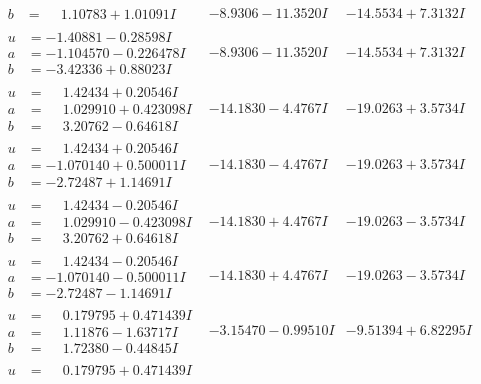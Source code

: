 \documentclass[1p]{elsarticle_modified}
\theoremstyle{definition}
\begin{document}
$$\begin{array}{c|c|c}
\begin{aligned}
b &= \phantom{-}1.10783 + 1.01091 I\end{aligned}
 & -8.9306 - 11.3520 I & -14.5534 + 7.3132 I \\ \hline\begin{aligned}
u &= -1.40881 - 0.28598 I \\
a &= -1.104570 - 0.226478 I \\
b &= -3.42336 + 0.88023 I\end{aligned}
 & -8.9306 - 11.3520 I & -14.5534 + 7.3132 I \\ \hline\begin{aligned}
u &= \phantom{-}1.42434 + 0.20546 I \\
a &= \phantom{-}1.029910 + 0.423098 I \\
b &= \phantom{-}3.20762 - 0.64618 I\end{aligned}
 & -14.1830 - 4.4767 I & -19.0263 + 3.5734 I \\ \hline\begin{aligned}
u &= \phantom{-}1.42434 + 0.20546 I \\
a &= -1.070140 + 0.500011 I \\
b &= -2.72487 + 1.14691 I\end{aligned}
 & -14.1830 - 4.4767 I & -19.0263 + 3.5734 I \\ \hline\begin{aligned}
u &= \phantom{-}1.42434 - 0.20546 I \\
a &= \phantom{-}1.029910 - 0.423098 I \\
b &= \phantom{-}3.20762 + 0.64618 I\end{aligned}
 & -14.1830 + 4.4767 I & -19.0263 - 3.5734 I \\ \hline\begin{aligned}
u &= \phantom{-}1.42434 - 0.20546 I \\
a &= -1.070140 - 0.500011 I \\
b &= -2.72487 - 1.14691 I\end{aligned}
 & -14.1830 + 4.4767 I & -19.0263 - 3.5734 I \\ \hline\begin{aligned}
u &= \phantom{-}0.179795 + 0.471439 I \\
a &= \phantom{-}1.11876 - 1.63717 I \\
b &= \phantom{-}1.72380 - 0.44845 I\end{aligned}
 & -3.15470 - 0.99510 I & -9.51394 + 6.82295 I \\ \hline\begin{aligned}
u &= \phantom{-}0.179795 + 0.471439 I \\

\end{aligned}
\end{array}$$
\end{document}
